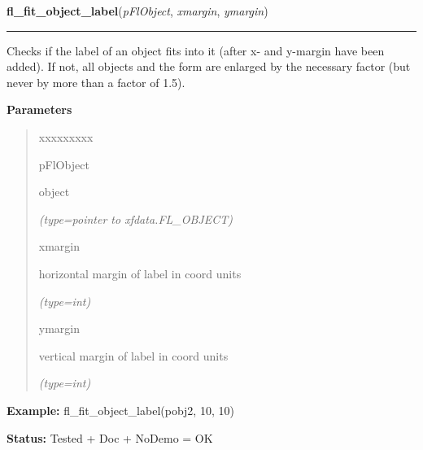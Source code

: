     \vspace{0.5ex}

\hspace{.8\funcindent}\begin{boxedminipage}{\funcwidth}

    \raggedright \textbf{fl\_fit\_object\_label}(\textit{pFlObject}, \textit{xmargin}, \textit{ymargin})

    \vspace{-1.5ex}

    \rule{\textwidth}{0.5\fboxrule}
\setlength{\parskip}{2ex}
    Checks if the label of an object fits into it (after x- and y-margin 
    have been added). If not, all objects and the form are enlarged by the 
    necessary factor (but never by more than a factor of 1.5).

\setlength{\parskip}{1ex}
      \textbf{Parameters}
      \vspace{-1ex}

      \begin{quote}
        \begin{Ventry}{xxxxxxxxx}

          \item[pFlObject]

          object

            {\it (type=pointer to xfdata.FL\_OBJECT)}

          \item[xmargin]

          horizontal margin of label in coord units

            {\it (type=int)}

          \item[ymargin]

          vertical margin of label in coord units

            {\it (type=int)}

        \end{Ventry}

      \end{quote}

\textbf{Example:} fl\_fit\_object\_label(pobj2, 10, 10)



\textbf{Status:} Tested + Doc + NoDemo = OK



    \end{boxedminipage}

    \label{xformslib:flbasic:fl_get_object_geometry}

